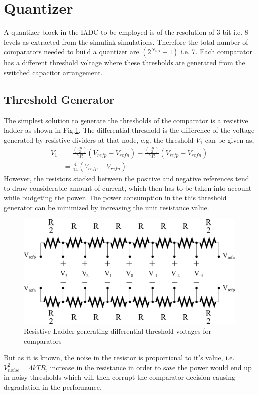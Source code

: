 \section{Quantizer}
A quantizer block in the IADC to be employed is of the resolution of 3-bit i.e. 8 levels as extracted from the simulink simulations. Therefore the total number of comparators needed to build a quantizer are $(2^{N_{SD}}-1)$ i.e. 7. Each comparator has a different threshold voltage where these thresholds are generated from the switched capacitor arrangement. 

\subsection{Threshold Generator}
The simplest solution to generate the thresholds of the comparator is a resistive ladder as shown in Fig.\ref{fig:res_lad}. The differential threshold is the difference of the voltage generated by resistive dividers at that node, e.g. the threshold $V_{1}$ can be given as,
%
\begin{equation}
    \begin{split}
        V_1 &= \frac{\left(\frac{9R}{2}\right)}{7R}\left(V_{refp}-V_{refn}\right)-\frac{\left(\frac{5R}{2}\right)}{7R}\left(V_{refp}-V_{refn}\right)\\
            &=\frac{4}{14}\left(V_{refp}-V_{refn}\right)
    \end{split}
\end{equation}
%
However, the resistors stacked between the positive and negative references tend to draw considerable amount of current, which then has to be taken into account while budgeting the power. The power consumption in the this threshold generator can be minimized by increasing the unit resistance value. 
%
\begin{figure}[h]
\centering
\includegraphics[width=0.85\columnwidth]{Chap05/Figures/resistive_ladder.png}
\caption{Resistive Ladder generating differential threshold voltages for comparators}
\label{fig:res_lad}
\end{figure}
%
But as it is known, the noise in the resistor is proportional to it's value, i.e. $V_{noise}^2=4kTR$, increase in the resistance in order to save the power would end up in noisy thresholds which will then corrupt the comparator decision causing degradation in the performance.

